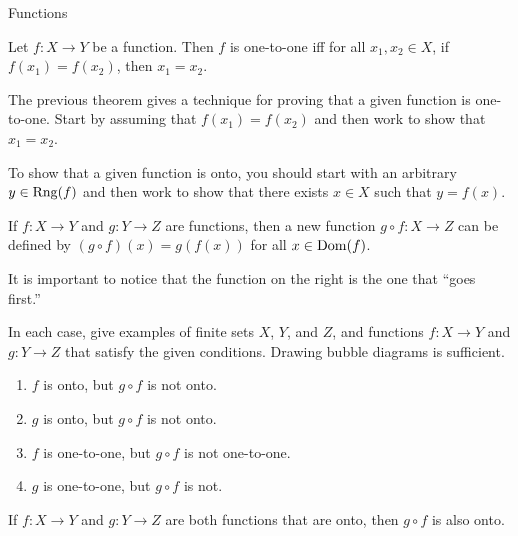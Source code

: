 \begin{section}{Functions}
\begin{exercise}
\end{exercise}

\begin{theorem}
Let \(f:X\to Y\) be a function.  Then \(f\) is one-to-one iff for all \(x_{1}, x_{2}\in X\), if \(f(x_{1})=f(x_{2})\), then \(x_{1}=x_{2}\).
\end{theorem}

\begin{remark}
The previous theorem gives a technique for proving that a given function is one-to-one.  Start by assuming that \(f(x_{1})=f(x_{2})\) and then work to show that \(x_{1}=x_{2}\).
\end{remark}

\begin{remark}
To show that a given function is onto, you should start with an arbitrary \(y\in \operatorname{Rng}(f)\) and then work to show that there exists \(x\in X\) such that \(y=f(x)\).
\end{remark}

\begin{definition}
If \(f:X\to Y\) and \(g:Y\to Z\) are functions, then a new function \(g\circ f:X\to Z\) can be defined by \((g\circ f)(x)=g(f(x))\) for all \(x\in\operatorname{Dom}(f)\).
\end{definition}

\begin{remark}
It is important to notice that the function on the right is the one that ``goes first.''
\end{remark}

\begin{exercise}
In each case, give examples of finite sets \(X\), \(Y\), and \(Z\), and functions \(f:X\to Y\) and \(g:Y\to Z\) that satisfy the given conditions.  Drawing bubble diagrams is sufficient.
\begin{enumerate}
\item \(f\) is onto, but \(g\circ f\) is not onto.
\item \(g\) is onto, but \(g\circ f\) is not onto.
\item \(f\) is one-to-one, but \(g\circ f\) is not one-to-one.
\item \(g\) is one-to-one, but \(g\circ f\) is not.
\end{enumerate}
\end{exercise}

\begin{theorem}
If \(f:X\to Y\) and \(g:Y\to Z\) are both functions that are onto, then \(g\circ f\) is also onto.
\end{theorem}


\end{section}
